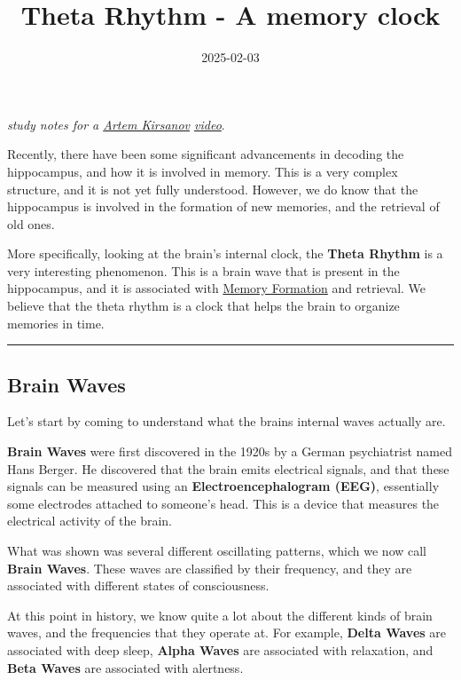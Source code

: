 \documentclass[
]{article}
\title{Theta Rhythm - A memory clock}
\author{}
\date{2025-02-03}
\begin{document}
\maketitle

\emph{study notes for a \href{Artem\%20Kirsanov}{Artem Kirsanov}
\href{https://youtu.be/5CxSoFK5tOQ?si=xNx2_g403li49K1i}{video}}.

Recently, there have been some significant advancements in decoding the
hippocampus, and how it is involved in memory. This is a very complex
structure, and it is not yet fully understood. However, we do know that
the hippocampus is involved in the formation of new memories, and the
retrieval of old ones.

More specifically, looking at the brain's internal clock, the
\textbf{Theta Rhythm} is a very interesting phenomenon. This is a brain
wave that is present in the hippocampus, and it is associated with
\href{Memory\%20Formation}{Memory Formation} and retrieval. We believe
that the theta rhythm is a clock that helps the brain to organize
memories in time.

\begin{center}\rule{0.5\linewidth}{0.5pt}\end{center}

\subsection{Brain Waves}\label{brain-waves}

Let's start by coming to understand what the brains internal waves
actually are.

\textbf{Brain Waves} were first discovered in the 1920s by a German
psychiatrist named Hans Berger. He discovered that the brain emits
electrical signals, and that these signals can be measured using an
\textbf{Electroencephalogram (EEG)}, essentially some electrodes
attached to someone's head. This is a device that measures the
electrical activity of the brain.

What was shown was several different oscillating patterns, which we now
call \textbf{Brain Waves}. These waves are classified by their
frequency, and they are associated with different states of
consciousness.

At this point in history, we know quite a lot about the different kinds
of brain waves, and the frequencies that they operate at. For example,
\textbf{Delta Waves} are associated with deep sleep, \textbf{Alpha
Waves} are associated with relaxation, and \textbf{Beta Waves} are
associated with alertness.
\end{document}
